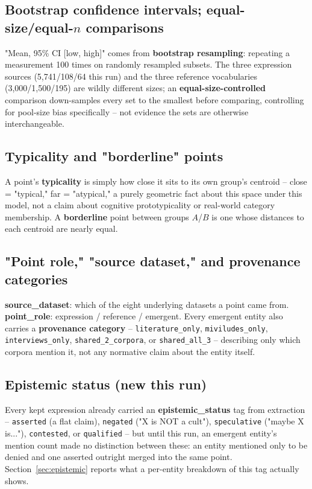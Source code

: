\documentclass[11pt,a4paper]{article}
\newcommand{\jargon}[1]{\textbf{#1}}
\begin{document}
\subsection{Bootstrap confidence intervals; equal-size/equal-$n$ comparisons}
"Mean, 95\% CI [low, high]" comes from \jargon{bootstrap resampling}:
repeating a measurement 100 times on randomly resampled subsets. The
three expression sources (5,741/108/64 this run) and the three reference
vocabularies (3,000/1,500/195) are wildly different sizes; an
\jargon{equal-size-controlled} comparison down-samples every set to the
smallest before comparing, controlling for pool-size bias specifically
-- not evidence the sets are otherwise interchangeable.

\subsection{Typicality and "borderline" points}
A point's \jargon{typicality} is simply how close it sits to its own
group's centroid -- close = "typical," far = "atypical," a purely
geometric fact about this space under this model, not a claim about
cognitive prototypicality or real-world category membership. A
\jargon{borderline} point between groups $A$/$B$ is one whose distances
to each centroid are nearly equal.

\subsection{"Point role," "source dataset," and provenance categories}
\jargon{source\_dataset}: which of the eight underlying datasets a point
came from. \jargon{point\_role}: expression / reference / emergent.
Every emergent entity also carries a \jargon{provenance category} --
\texttt{literature\_only}, \texttt{miviludes\_only},
\texttt{interviews\_only}, \texttt{shared\_2\_corpora}, or
\texttt{shared\_all\_3} -- describing only which corpora mention it, not
any normative claim about the entity itself.

\subsection{Epistemic status (new this run)}
Every kept expression already carried an \jargon{epistemic\_status} tag
from extraction -- \texttt{asserted} (a flat claim), \texttt{negated}
("X is NOT a cult"), \texttt{speculative} ("maybe X is..."),
\texttt{contested}, or \texttt{qualified} -- but until this run, an
emergent entity's mention count made no distinction between these: an
entity mentioned only to be denied and one asserted outright merged into
the same point. Section~\ref{sec:epistemic} reports what a per-entity
breakdown of this tag actually shows.
\end{document}
